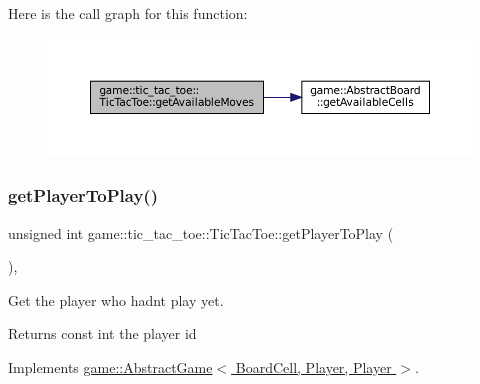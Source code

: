 Here is the call graph for this function\+:
\nopagebreak
\begin{figure}[H]
\begin{center}
\leavevmode
\includegraphics[width=350pt]{classgame_1_1tic__tac__toe_1_1_tic_tac_toe_af5dd08e48f442a4f54402423e996887f_cgraph}
\end{center}
\end{figure}
\mbox{\label{classgame_1_1tic__tac__toe_1_1_tic_tac_toe_ae460add5608bc785e202c876dea8f9ba}} 
\subsubsection{\texorpdfstring{get\+Player\+To\+Play()}{getPlayerToPlay()}}
{\footnotesize\ttfamily unsigned int game\+::tic\+\_\+tac\+\_\+toe\+::\+Tic\+Tac\+Toe\+::get\+Player\+To\+Play (\begin{DoxyParamCaption}{ }\end{DoxyParamCaption})\hspace{0.3cm}{\ttfamily [override]}, {\ttfamily [virtual]}}



Get the player who hadn\textquotesingle{}t play yet. 

\begin{DoxyReturn}{Returns}
const int the player id 
\end{DoxyReturn}


Implements \hyperlink{classgame_1_1_abstract_game_a059d72564d4658be3c246d8865080d92}{game\+::\+Abstract\+Game$<$ Board\+Cell, Player, Player $>$}.

